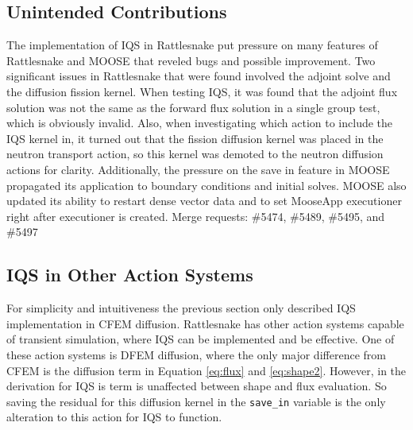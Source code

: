 \documentclass[12pt]{scrartcl}
\begin{document}
\subsection{Unintended Contributions}
The implementation of IQS in Rattlesnake put pressure on many features of Rattlesnake and MOOSE that reveled bugs and possible improvement.  Two significant issues in Rattlesnake that were found involved the adjoint solve and the diffusion fission kernel.  When testing IQS, it was found that the adjoint flux solution was not the same as the forward flux solution in a single group test, which is obviously invalid.  Also, when investigating which action to include the IQS kernel in, it turned out that the fission diffusion kernel was placed in the neutron transport action, so this kernel was demoted to the neutron diffusion actions for clarity.  Additionally, the pressure on the save in feature in MOOSE propagated its application to boundary conditions and initial solves.  MOOSE also updated its ability to restart dense vector data and to set MooseApp executioner right after executioner is created.  Merge requests: \#5474, \#5489, \#5495, and \#5497

\subsection{IQS in Other Action Systems}

For simplicity and intuitiveness the previous section only described IQS implementation in CFEM diffusion.  Rattlesnake has other action systems capable of transient simulation, where IQS can be implemented and be effective.  One of these action systems is DFEM diffusion, where the only major difference from CFEM is the diffusion term in Equation \ref{eq:flux} and \ref{eq:shape2}.  However, in the derivation for IQS is term is unaffected between shape and flux evaluation.  So saving the residual for this diffusion kernel in the \texttt{save\_in} variable is the only alteration to this action for IQS to function. \\
\end{document}
